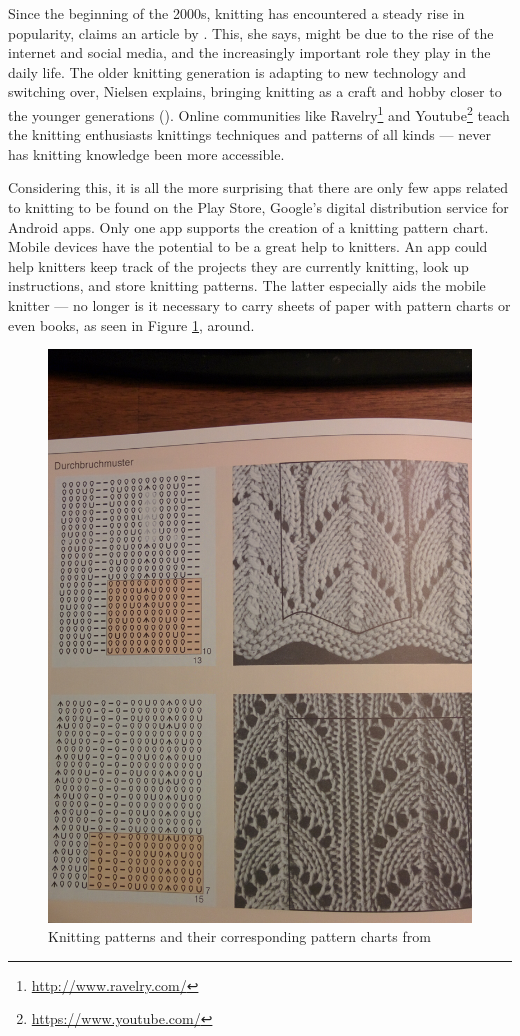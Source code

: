 Since the beginning of the 2000s, knitting has encountered a steady rise in popularity, claims an article by \cite{lewis_rise_of_knitting}. This, she says, might be due to the rise of the internet and social media, and the increasingly important role they play in the daily life. The older knitting generation is adapting to new technology and switching over, Nielsen explains, bringing knitting as a craft and hobby closer to the younger generations (\cite{lewis_rise_of_knitting}). Online communities like Ravelry\footnote{\url{http://www.ravelry.com/}} and Youtube\footnote{\url{https://www.youtube.com/}} teach the knitting enthusiasts knittings techniques and patterns of all kinds --- never has knitting knowledge been more accessible.

Considering this, it is all the more surprising that there are only few apps related to knitting to be found on the Play Store, Google's digital distribution service for Android apps. Only one app supports the creation of a knitting pattern chart. Mobile devices have the potential to be a great help to knitters. An app could help knitters keep track of the projects they are currently knitting, look up instructions, and store knitting patterns. The latter especially aids the mobile knitter --- no longer is it necessary to carry sheets of paper with pattern charts or even books, as seen in Figure \ref{fig:knitting_book}, around.

\begin{figure}[H]
	\centering
    \includegraphics[width=.45\textwidth]{images/knitting_pattern_chart_book.jpg}
   \caption[{Knitting patterns and their corresponding pattern charts \protect{}}]{Knitting patterns and their corresponding pattern charts from \protect\cite[p142]{Natter1983}}
   \label{fig:knitting_book}
\end{figure}

